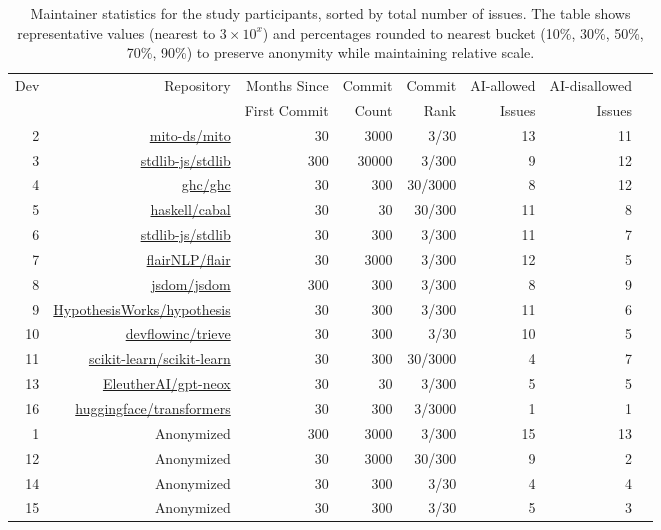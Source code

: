 \begin{table}[htbp]
\centering \small
\begin{tabular}{rrrrrrrr}
\toprule
Dev & Repository & Months Since & Commit & Commit & AI-allowed & AI-disallowed \\
 & & First Commit & Count & Rank & Issues & Issues \\
\midrule
2 & \href{https://github.com/mito-ds/mito}{mito-ds/mito} & 30 & 3000 & 3/30 & 13 & 11 \\
3 & \href{https://github.com/stdlib-js/stdlib}{stdlib-js/stdlib} & 300 & 30000 & 3/300 & 9 & 12 \\
4 & \href{https://github.com/ghc/ghc}{ghc/ghc} & 30 & 300 & 30/3000 & 8 & 12 \\
5 & \href{https://github.com/haskell/cabal}{haskell/cabal} & 30 & 30 & 30/300 & 11 & 8 \\
6 & \href{https://github.com/stdlib-js/stdlib}{stdlib-js/stdlib} & 30 & 300 & 3/300 & 11 & 7 \\
7 & \href{https://github.com/flairNLP/flair}{flairNLP/flair} & 30 & 3000 & 3/300 & 12 & 5 \\
8 & \href{https://github.com/jsdom/jsdom}{jsdom/jsdom} & 300 & 300 & 3/300 & 8 & 9 \\
9 & \href{https://github.com/HypothesisWorks/hypothesis}{HypothesisWorks/hypothesis} & 30 & 300 & 3/300 & 11 & 6 \\
10 & \href{https://github.com/devflowinc/trieve}{devflowinc/trieve} & 30 & 300 & 3/30 & 10 & 5 \\
11 & \href{https://github.com/scikit-learn/scikit-learn}{scikit-learn/scikit-learn} & 30 & 300 & 30/3000 & 4 & 7 \\
13 & \href{https://github.com/EleutherAI/gpt-neox}{EleutherAI/gpt-neox} & 30 & 30 & 3/300 & 5 & 5 \\
16 & \href{https://github.com/huggingface/transformers}{huggingface/transformers} & 30 & 300 & 3/3000 & 1 & 1 \\
1 & Anonymized & 300 & 3000 & 3/300 & 15 & 13 \\
12 & Anonymized & 30 & 3000 & 30/300 & 9 & 2 \\
14 & Anonymized & 30 & 300 & 3/30 & 4 & 4 \\
15 & Anonymized & 30 & 300 & 3/30 & 5 & 3 \\
\bottomrule
\end{tabular}
\caption{Maintainer statistics for the study participants, sorted by total number of issues. The table shows representative values (nearest to $3 \times 10^x$) and percentages rounded to nearest bucket (10\%, 30\%, 50\%, 70\%, 90\%) to preserve anonymity while maintaining relative scale.}
\label{tab:maintainer_stats}
\end{table}
